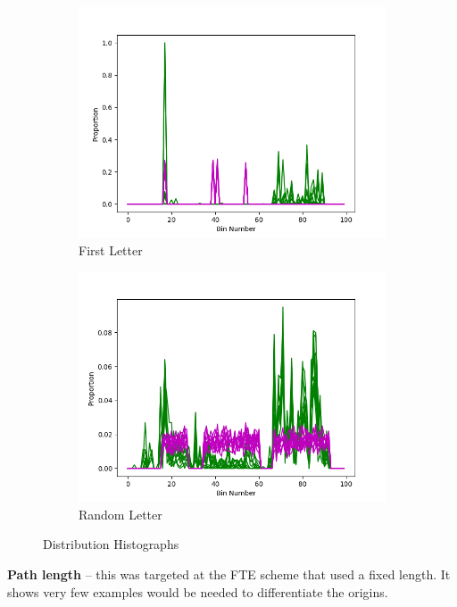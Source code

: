 \documentclass[ %
                    author={Samuel Russell},
                supervisor={Prof. Bogdan Warinschi},
                    degree={MEng},
                     title={Innocuous Ciphertexts},
                  subtitle={The DE-CENSOR Scheme},
                      type={research},
                      year={2018} ]{dissertation}
\begin{document}
\begin{figure}[h]
\begin{subfigure}[b]{0.3\linewidth}
		\includegraphics[width=\linewidth]{first_dist}
		\caption{First Letter}
		\label{fig:first_hist}
	\end{subfigure}
	\begin{subfigure}[b]{0.3\linewidth}
		\includegraphics[width=\linewidth]{rand_dist}
		\caption{Random Letter}
		\label{fig:rand_hist}
	\end{subfigure}

	\caption{Distribution Histographs}\label{fig:hists}
\end{figure}

\textbf{Path length} -- this was targeted at the FTE scheme that used a fixed length. It shows very few examples would be needed to differentiate the origins.
\end{document}
